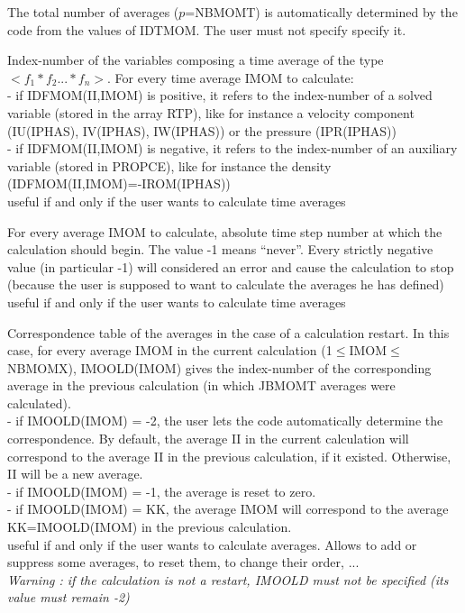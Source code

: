 The total number of averages ($p$=NBMOMT) is automatically determined by
the code from the values of IDTMOM. The user must not specify specify it.

{Index-number of the variables composing a time average of the type
$<f_1*f_2...*f_n>$. For every time average IMOM to calculate:\\
\hspace*{1.3cm} - if IDFMOM(II,IMOM) is positive, it refers to the
                  index-number of a solved variable (stored in the array
                  RTP), like for instance a velocity component
                  (IU(IPHAS), IV(IPHAS), IW(IPHAS)) or the pressure
                  (IPR(IPHAS))\\
\hspace*{1.3cm} - if IDFMOM(II,IMOM) is negative, it refers to the
                  index-number of an auxiliary variable (stored in
                  PROPCE), like for instance the density
                  (IDFMOM(II,IMOM)=-IROM(IPHAS))\\
useful if and only if the user wants to calculate time averages}

{For every average IMOM to calculate, absolute time step number at which
the calculation should begin. The value -1 means ``never''. Every
strictly negative value (in particular -1) will considered an error and
cause the calculation to stop (because the user is supposed to want to
calculate the averages he has defined)\\
useful if and only if the user wants to calculate time averages}

{Correspondence table of the averages in the case of a calculation
restart. In this case, for every average IMOM in the current
calculation (1$\leqslant$IMOM$\leqslant$NBMOMX), IMOOLD(IMOM) gives the
index-number of the corresponding average in the previous calculation
(in which JBMOMT averages were calculated). \\
\hspace*{1.3cm} - if IMOOLD(IMOM) = -2, the user lets the code automatically
            determine the
                correspondence. By default, the average II in the
                current calculation will correspond to the average II in
                the previous calculation, if it existed.
                Otherwise, II will be a new average.\\
\hspace*{1.3cm} - if IMOOLD(IMOM) = -1, the average is reset to zero.\\
\hspace*{1.3cm} - if IMOOLD(IMOM) = KK, the average IMOM will correspond
to the average KK=IMOOLD(IMOM) in the previous calculation.\\
useful if and only if the user wants to calculate averages.
Allows to add or suppress some averages, to reset them, to change their
order, ...\\
{\em Warning : if the calculation is not a restart, IMOOLD must not be
specified (its value must remain -2)}}

